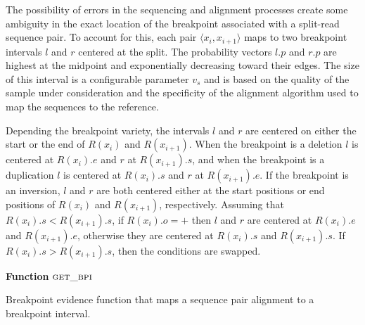 \documentclass[11pt]{article}
\begin{document}
The possibility of errors in the sequencing and alignment processes create some
ambiguity in the exact location of the breakpoint associated with a split-read
sequence pair.  To account for this, each pair $\langle x_i, x_{i+1} \rangle$
maps to two breakpoint intervals $l$ and $r$ centered at the split. The 
probability vectors $l.p$ and $r.p$ are highest at the midpoint and
exponentially decreasing toward their edges.  The size of this interval is a
configurable parameter $v_s$ and is based on the quality of the sample under
consideration and the specificity of the alignment algorithm used to map the
sequences to the reference.

Depending the breakpoint variety, the intervals $l$ and $r$ are centered on
either the start or the end of $R(x_i)$ and $R(x_{i+1})$.  When the breakpoint
is a deletion $l$ is centered at $R(x_i).e$ and $r$ at $R(x_{i+1}).s$, and when
the breakpoint is a duplication $l$ is centered at $R(x_i).s$ and $r$ at
$R(x_{i+1}).e$.  If the breakpoint is an inversion, $l$ and $r$ are both 
centered either at the start positions or end positions of $R(x_i)$ and
$R(x_{i+1})$, respectively.  Assuming that $R(x_i).s<R(x_{i+1}).s$, if
$R(x_i).o=+$ then $l$ and $r$ are centered at $R(x_i).e$ and  $R(x_{i+1}).e$,
otherwise they are centered at $R(x_i).s$ and  $R(x_{i+1}).s$.  If
$R(x_i).s>R(x_{i+1}).s$, then the conditions are swapped.


\begin{algorithm}[H]
    \DontPrintSemicolon
    \footnotesize
    \BlankLine
    \textbf{Function} $\textsc{get\_bpi}$\;
	\caption{Breakpoint evidence function that maps a sequence pair alignment to
			a breakpoint interval.}
    \label{get_bp_sr}
\end{algorithm}
\end{document}
